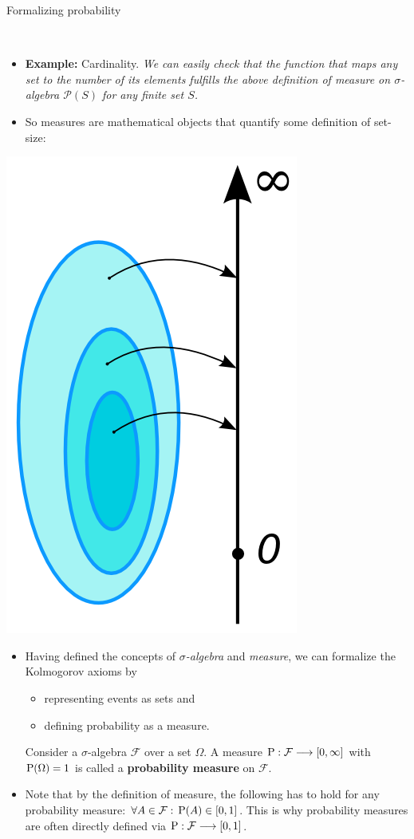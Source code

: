 \documentclass[a4,11pt]{beamer}
\newlength{\wideitemsep}
\let\olditem\item
\renewcommand{\item}{\setlength{\itemsep}{\wideitemsep}\olditem}
\begin{document}
\begin{frame}[allowframebreaks]{Formalizing probability}
\begin{definition}[Measure]
    \end{definition}\,\\
\begin{itemize}
    \item\textcolor{blueberry}{\textbf{Example:} Cardinality.} \emph{We can easily check that the function that maps any set to the number of its elements fulfills the above definition of measure on $\sigma$-algebra $\mathcal{P}(S)$ for any finite set $S$.}\pagebreak
    \item So measures are mathematical objects that quantify some definition of set-size:
   \end{itemize} 
    \begin{center}\vspace*{-.3cm}
        \includegraphics[width=.3\linewidth]{graphics/Measure_illustration.png}
    \end{center}
   
    
\pagebreak
\begin{itemize}    
        \item Having defined the concepts of \emph{$\sigma$-algebra} and \emph{measure}, we can formalize the Kolmogorov axioms by\smallskip\\\begin{itemize}
            \item representing events as sets and\vspace{-.5cm}\\
            \item defining probability as a measure.
        \end{itemize}
    
    \begin{definition}
        Consider a $\sigma$-algebra $\mathcal{F}$ over a set $\Omega$. A measure $\operatorname{P}:\mathcal{F}\longrightarrow [0,\infty]$ with $\operatorname{P}(\Omega)=1$ is called a \textbf{probability measure} on $\mathcal{F}$.
    \end{definition}
    \item Note that by the definition of measure, the following has to hold for any probability measure: $\forall A\in\mathcal{F}:\,\operatorname{P}(A)\in[0,1]$. This is why probability measures are often directly defined via $\operatorname{P}:\mathcal{F}\longrightarrow [0,1]$.
    \end{itemize}
\end{frame}
\end{document}
